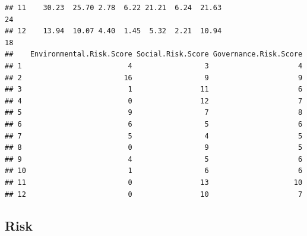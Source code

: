 \documentclass[
]{article}
\newenvironment{Shaded}{\begin{snugshade}}{\end{snugshade}}
\newcommand{\KeywordTok}[1]{\textcolor[rgb]{0.13,0.29,0.53}{\textbf{#1}}}
\newcommand{\NormalTok}[1]{#1}
\newcommand{\OperatorTok}[1]{\textcolor[rgb]{0.81,0.36,0.00}{\textbf{#1}}}
\newcommand{\StringTok}[1]{\textcolor[rgb]{0.31,0.60,0.02}{#1}}
\begin{document}
\begin{verbatim}
## 11    30.23  25.70 2.78  6.22 21.21  6.24  21.63                   24
## 12    13.94  10.07 4.40  1.45  5.32  2.21  10.94                   18
##    Environmental.Risk.Score Social.Risk.Score Governance.Risk.Score
## 1                         4                 3                     4
## 2                        16                 9                     9
## 3                         1                11                     6
## 4                         0                12                     7
## 5                         9                 7                     8
## 6                         6                 5                     6
## 7                         5                 4                     5
## 8                         0                 9                     5
## 9                         4                 5                     6
## 10                        1                 6                     6
## 11                        0                13                    10
## 12                        0                10                     7
\end{verbatim}

\hypertarget{risk}{%
\subsection{Risk}\label{risk}}

\begin{Shaded}
\end{Shaded}
\end{document}

